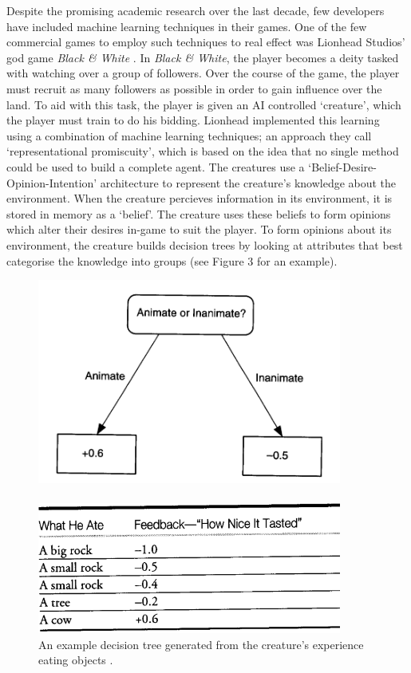 \documentclass[a4paper,oneside]{report}
\begin{document}
Despite the promising academic research over the last decade, few developers have included machine learning techniques in their games. One of the few commercial games to employ such techniques to real effect was Lionhead Studios' god game \emph{Black \& White} \cite{:hc}. In \emph{Black \& White}, the player becomes a deity tasked with watching over a group of followers. Over the course of the game, the player must recruit as many followers as possible in order to gain influence over the land. To aid with this task, the player is given an AI controlled `creature', which the player must train to do his bidding. Lionhead implemented this learning using a combination of machine learning techniques; an approach they call `representational promiscuity', which is based on the idea that no single method could be used to build a complete agent. The creatures use a `Belief-Desire-Opinion-Intention' architecture to represent the creature's knowledge about the environment. When the creature percieves information in its environment, it is stored in memory as a `belief'. The creature uses these beliefs to form opinions which alter their desires in-game to suit the player. To form opinions about its environment, the creature builds decision trees by looking at attributes that best categorise the knowledge into groups (see Figure 3 for an example).

\begin{figure}[h!]
	\centering
		\includegraphics[width=100mm]{sources/images/TastyTree}\paragraph{}
    	\includegraphics[width=100mm]{sources/images/TastyTable}
    	\caption{An example decision tree generated from the creature's experience eating objects \cite{:hc}.}
\end{figure}
\end{document}
